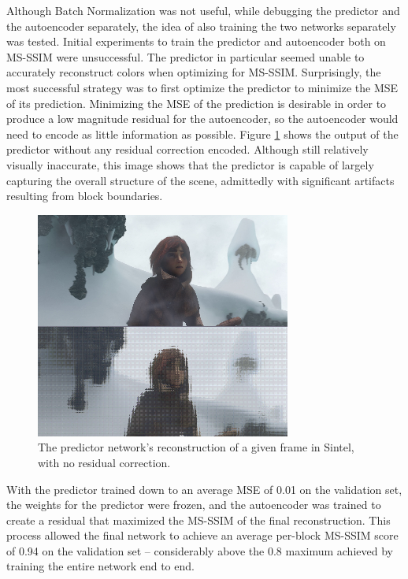 \documentclass[10pt,twocolumn,letterpaper]{article}
\begin{document}
Although Batch Normalization was not useful, while debugging the predictor and the autoencoder separately, the idea of also training the two networks separately was tested. Initial experiments to train the predictor and autoencoder both on MS-SSIM were unsuccessful. The predictor in particular seemed unable to accurately reconstruct colors when optimizing for MS-SSIM. Surprisingly, the most successful strategy was to first optimize the predictor to minimize the MSE of its prediction. Minimizing the MSE of the prediction is desirable in order to produce a low magnitude residual for the autoencoder, so the autoencoder would need to encode as little information as possible. Figure \ref{fig:noauto} shows the output of the predictor without any residual correction encoded. Although still relatively visually inaccurate, this image shows that the predictor is capable of largely capturing the overall structure of the scene, admittedly with significant artifacts resulting from block boundaries.
\begin{figure}[t]
\begin{center}
  \includegraphics[width=0.8\linewidth]{noauto}
\end{center}
   \caption{The predictor network's reconstruction of a given frame in Sintel, with no residual correction.}
   \label{fig:noauto}
\end{figure}

With the predictor trained down to an average MSE of 0.01 on the validation set, the weights for the predictor were frozen, and the autoencoder was trained to create a residual that maximized the MS-SSIM of the final reconstruction. This process allowed the final network to achieve an average per-block MS-SSIM score of 0.94 on the validation set -- considerably above the 0.8 maximum achieved by training the entire network end to end.
\end{document}
